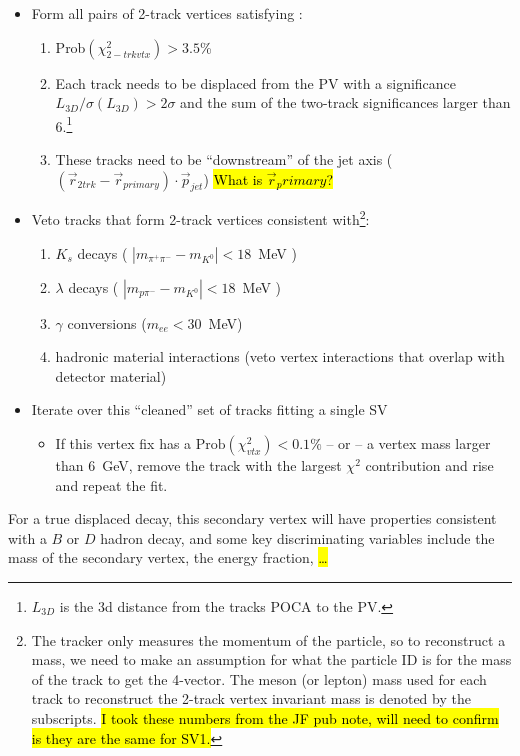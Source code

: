 \begin{itemize}
	\item Form all pairs of 2-track vertices satisfying \cite{giacinto-thesis}:
	\begin{enumerate}
		\item Prob$(\chi^2_{2-trk vtx}) > 3.5$\%
		\item Each track needs to be displaced from the PV with a significance $L_{3D} / \sigma(L_{3D}) > 2\sigma$ and the sum of the two-track significances larger than 6.\footnote{$L_{3D}$ is the 3d distance from the tracks POCA to the PV.}
		\item These tracks need to be ``downstream'' of the jet axis ($\left( \vec{r}_{2 trk} - \vec{r}_{primary} \right) \cdot \vec{p}_{jet} $) \hl{What is $\vec{r}_primary$?}
	\end{enumerate}
	\item Veto tracks that form 2-track vertices consistent with\footnote{The tracker only measures the momentum of the particle, so to reconstruct a mass, we need to make an assumption for what the particle ID is for the mass of the track to get the 4-vector. The meson (or lepton) mass used for each track to reconstruct the 2-track vertex invariant mass is denoted by the subscripts. \hl{I took these numbers from the JF pub note, will need to confirm is they are the same for SV1.}}:
	\begin{enumerate}
		\item $K_s$ decays ( $|m_{\pi^+ \pi^-} - m_{K^0}| < 18$~MeV )
		\item $\lambda$ decays ( $|m_{p \pi^-} - m_{K^0}| < 18$~MeV )
		\item $\gamma$ conversions ($m_{ee} < 30$~MeV)  
		\item hadronic material interactions (veto vertex interactions that overlap with detector material)
	\end{enumerate}
	\item Iterate over this ``cleaned'' set of tracks fitting a single SV  
	\begin{itemize}
		\item If this vertex fix has a $\mathrm{Prob}(\chi^2_{vtx}) < 0.1\%$ -- or -- a vertex mass larger than 6~GeV, remove the track with the largest $\chi^2$ contribution and rise and repeat the fit.
	\end{itemize}	
\end{itemize}


For a true displaced decay, this secondary vertex will have properties consistent with a $B$ or $D$ hadron decay, and some key discriminating variables include the mass of the secondary vertex, the energy fraction, \hl{\ldots}

